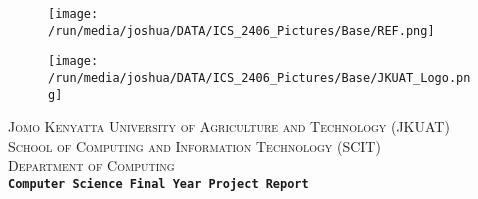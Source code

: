 \documentclass[12pt,svgnames,smaller]{article} %
\begin{document}


\begin{figure}[t] 
\begin{flushright}
\texttt{[image: /run/media/joshua/DATA/ICS\_2406\_Pictures/Base/REF.png]} 
\end{flushright}
\end{figure}

\begin{figure}  
\begin{center}  
\texttt{[image: /run/media/joshua/DATA/ICS\_2406\_Pictures/Base/JKUAT\_Logo.png]}
\end{center}  
\end{figure}

\begin{center}
\textsc{\large Jomo Kenyatta University of Agriculture and Technology (JKUAT)}\\[0.6cm]
\textsc{\large School of Computing and Information Technology (SCIT)}\\[0.6cm]
\textsc{\large Department of Computing}\\[0.6cm]
\textbf{ \texttt{\textbf{Computer Science Final Year Project Report} }}{\vspace*{10 mm}}
\end{center}
\end{document}
